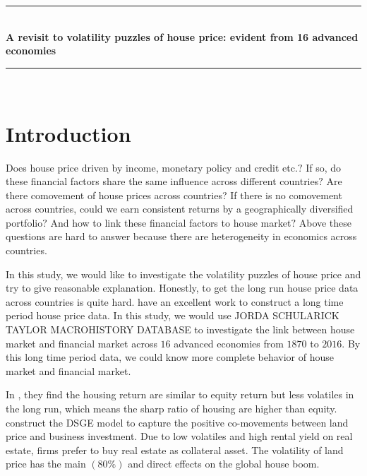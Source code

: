 \documentclass[12pt,a4paper,hyperref]{article}
\begin{document}
\begin{titlepage}

\newcommand{\HRule}{\rule{\linewidth}{0.5mm}} %

\center %



\HRule \\[0.4cm]
{ \normalsize \bfseries A revisit to volatility puzzles of house price: evident from 16 advanced economies}\\[0.2cm] %
\HRule \\[1.5cm]


\vfill %

\end{titlepage}

\newpage
\tableofcontents
\newpage
\section{Introduction}
Does house price driven by income, monetary policy and credit etc.$?$
If so, do these financial factors share the same influence across different countries$?$
Are there comovement of house prices across countries? If there is no comovement across countries, could we earn consistent returns by a geographically diversified portfolio$?$  And how to link these financial factors to house market$?$
Above these questions are hard to answer because there are heterogeneity in economics across countries.

In this study, we would like to investigate the volatility puzzles of house price and try to give reasonable explanation. Honestly, to get the long run house price data across countries is quite hard. \citet{Jorda:2019} have an excellent work to construct a long time period house price data. In this study, we would use JORDA SCHULARICK TAYLOR MACROHISTORY DATABASE to investigate the link between house market and financial market across $16$ advanced economies from $1870$ to $2016$. By this long time period data, we could know more complete behavior of house market and financial market.


In \citet{Jorda:2019}, they find the housing return are similar to equity return but less volatiles in the long run, which means the sharp ratio of housing are higher than equity. \citet{Liu:2013} construct the DSGE model to capture the positive co-movements between land price and business investment. Due to low volatiles and high rental yield on real estate, firms prefer to buy real estate as collateral asset. The volatility of land price has the main $(80\%)$ and direct effects on the global house boom.
\end{document}
